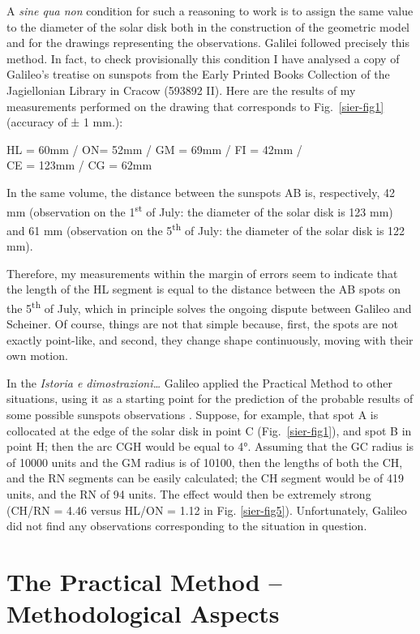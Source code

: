 \begin{artengenv}
A \textit{sine qua non} condition for such a reasoning to work is to assign the same value to the diameter of the solar
disk both in the construction of the geometric model and for the drawings representing the observations. Galilei
followed precisely this method. In fact,
to check provisionally this condition
I have analysed a copy of Galileo’s treatise on sunspots from the Early
Printed Books Collection of the Jagiellonian Library in Cracow (593892 II). Here are the results of my measurements
performed on the drawing that corresponds to Fig.~\ref{sier-fig1} (accuracy of ± 1 mm.):
\medskip

{\centering
HL = 60mm / ON= 52mm / GM = 69mm / FI = 42mm /\\CE = 123mm / CG = 62mm
\par}
\smallskip

In the same volume, the distance between the sunspots AB is, respectively, 42 mm (observation on the 1\textsuperscript{st}
of July: the diameter of
the solar disk is 123 mm) and 61 mm (observation on the 5\textsuperscript{th} of July: the diameter of the solar disk is 122 mm).

Therefore, my measurements within the margin of errors seem to indicate that the length of the HL segment is equal to
the distance between the AB spots on the 5\textsuperscript{th} of July, which in principle solves the ongoing dispute between Galileo and
Scheiner. Of course, things are not that simple because, first, the spots are not exactly point-like, and second, they
change shape continuously, moving with their own motion.

In the \textit{Istoria e dimostrazioni\ldots} Galileo applied the Practical Method to other situations, using it as a
starting point for the prediction of the probable results of some possible sunspots observations
\parencite[see  V, 124.13-21;][p.116]{galilei_sunspots_2010}.
 Suppose, for example, that spot A is collocated
at the edge of the solar disk in point C (Fig.~\ref{sier-fig1}), and spot B in point H; then the arc CGH would be equal to 4°.
Assuming that the GC radius is of 10000 units and the GM radius is of 10100, then the lengths of both the CH, and the
RN segments can be easily calculated; the CH segment would be of 419 units, and the RN of 94 units. The effect would
then be extremely strong (CH/RN = 4.46 versus HL/ON = 1.12 in Fig. \ref{sier-fig5}). Unfortunately, Galileo did not find any
observations corresponding to the situation in question.

\section{The Practical Method -- Methodological Aspects}


\end{artengenv}
